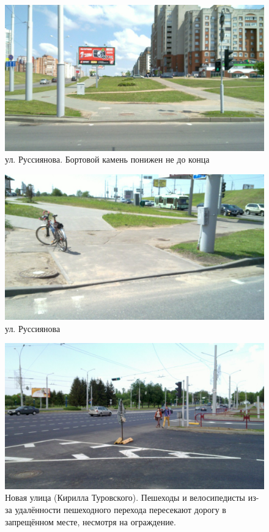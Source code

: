 \documentclass[a4paper,14pt,twoside]{extarticle}
\begin{document}
\begin{figure}[h!]
    \centering
    \includegraphics[width=\textwidth]{Pictures/1000000000000A00000005A05FA4F502.jpg}
    \caption{ул. Руссиянова. Бортовой камень понижен не до конца}
\end{figure}

\begin{figure}[h!]
    \centering
    \includegraphics[width=\textwidth]{Pictures/1000000000000A00000005A0831C2317.jpg}
    \caption{ул. Руссиянова}
\end{figure}

\begin{figure}[h!]
    \centering
    \includegraphics[width=\textwidth]{Pictures/1000000000000A00000005A085C46430.jpg}
    \caption{Новая улица (Кирилла Туровского). Пешеходы и велосипедисты из-за удалённости пешеходного перехода пересекают дорогу в запрещённом месте, несмотря на ограждение.}
\end{figure}
\end{document}
